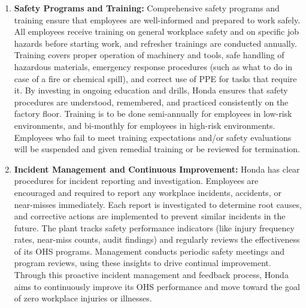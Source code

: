\begin{enumerate}
    \item \textbf{Safety Programs and Training:} Comprehensive safety programs and training ensure that employees are well-informed and prepared to work safely. All employees receive training on general workplace safety and on specific job hazards before starting work, and refresher trainings are conducted annually. Training covers proper operation of machinery and tools, safe handling of hazardous materials, emergency response procedures (such as what to do in case of a fire or chemical spill), and correct use of PPE for tasks that require it. By investing in ongoing education and drills, Honda ensures that safety procedures are understood, remembered, and practiced consistently on the factory floor. Training is to be done semi-annually for employees in low-risk environments, and bi-monthly for employees in high-risk environments. Employees who fail to meet training expectations and/or safety evaluations will be suspended and given remedial training or be reviewed for termination.
    \item \textbf{Incident Management and Continuous Improvement:} Honda has clear procedures for incident reporting and investigation. Employees are encouraged and required to report any workplace incidents, accidents, or near-misses immediately. Each report is investigated to determine root causes, and corrective actions are implemented to prevent similar incidents in the future. The plant tracks safety performance indicators (like injury frequency rates, near-miss counts, audit findings) and regularly reviews the effectiveness of its OHS programs. Management conducts periodic safety meetings and program reviews, using these insights to drive continual improvement. Through this proactive incident management and feedback process, Honda aims to continuously improve its OHS performance and move toward the goal of zero workplace injuries or illnesses.
\end{enumerate}

